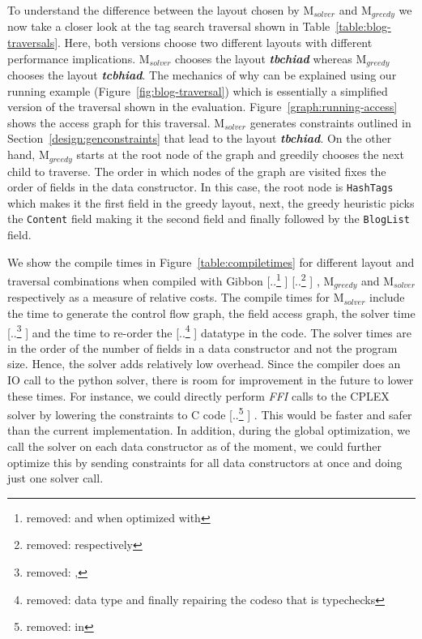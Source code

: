\documentclass[acmsmall,review,anonymous]{acmart}\settopmatter{printfolios=true,printccs=false,printacmref=false}
\newcommand{\figref}[1]{Figure~\ref{#1}\xspace}
\newcommand{\system}{{\sc Marmoset}\xspace}
\newcommand{\systemSolver}{{\sc M$_{\mathit{solver}}$}\xspace} %
\newcommand{\systemGreedy}{{\sc M$_{\mathit{greedy}}$}\xspace} %
\newcommand{\gibbon}{{\sc Gibbon}\xspace}
\providecommand{\DIFaddtex}[1]{{\protect\color{blue} \sf #1}} %
\providecommand{\DIFdeltex}[1]{{\protect\color{red} [..\footnote{removed: #1} ]}} %
\providecommand{\DIFaddbegin}{} %
\providecommand{\DIFaddend}{} %
\providecommand{\DIFdelbegin}{} %
\providecommand{\DIFdelend}{} %
\providecommand{\DIFadd}[1]{\texorpdfstring{\DIFaddtex{#1}}{#1}} %
\providecommand{\DIFdel}[1]{\texorpdfstring{\DIFdeltex{#1}}{}} %
\newcommand{\DIFscaledelfig}{0.5}
\newlength{\DIFdelgraphicswidth} %
\newlength{\DIFdelgraphicsheight} %
\newcommand{\DIFaddincludegraphics}[2][]{{\color{blue}\fbox{\DIFOincludegraphics[#1]{#2}}}} %
\newcommand{\DIFdelincludegraphics}[2][]{%
\sbox{\DIFdelgraphicsbox}{\DIFOincludegraphics[#1]{#2}}%
\settoboxwidth{\DIFdelgraphicswidth}{\DIFdelgraphicsbox} %
\settoboxtotalheight{\DIFdelgraphicsheight}{\DIFdelgraphicsbox} %
\scalebox{\DIFscaledelfig}{%
\parbox[b]{\DIFdelgraphicswidth}{\usebox{\DIFdelgraphicsbox}\\[-\baselineskip] \rule{\DIFdelgraphicswidth}{0em}}\llap{\resizebox{\DIFdelgraphicswidth}{\DIFdelgraphicsheight}{%
\setlength{\unitlength}{\DIFdelgraphicswidth}%
\begin{picture}(1,1)%
\thicklines\linethickness{2pt} %
{\color[rgb]{1,0,0}\put(0,0){\framebox(1,1){}}}%
{\color[rgb]{1,0,0}\put(0,0){\line( 1,1){1}}}%
{\color[rgb]{1,0,0}\put(0,1){\line(1,-1){1}}}%
\end{picture}%
}\hspace*{3pt}}} %
} %
\DeclareRobustCommand{\DIFaddbegin}{\DIFOaddbegin \let\includegraphics\DIFaddincludegraphics} %
\DeclareRobustCommand{\DIFaddend}{\DIFOaddend \let\includegraphics\DIFOincludegraphics} %
\DeclareRobustCommand{\DIFdelbegin}{\DIFOdelbegin \let\includegraphics\DIFdelincludegraphics} %
\DeclareRobustCommand{\DIFdelend}{\DIFOaddend \let\includegraphics\DIFOincludegraphics} %
\begin{document}
\DIFaddbegin \DIFadd{To understand the difference between the layout chosen by }\systemSolver \DIFadd{and }\systemGreedy \DIFadd{we now take a closer look at the tag search traversal shown in Table~\ref{table:blog-traversals}.
Here, both versions choose two different layouts with different performance implications. }\systemSolver \DIFadd{chooses the layout \textbf{\textit{tbchiad}} whereas }\systemGreedy \DIFadd{chooses 
the layout \textbf{\textit{tcbhiad}}. The mechanics of why can be explained using our running example (Figure~\ref{fig:blog-traversal}) which is essentially a simplified version of the 
traversal shown in the evaluation. Figure~\ref{graph:running-access} shows the access graph for this traversal. }\systemSolver \DIFadd{generates constraints 
outlined in Section~\ref{design:genconstraints} that lead to the layout \textbf{\textit{tbchiad}}. On the other hand, }\systemGreedy \DIFadd{starts at the root node of the graph and greedily chooses the next child to traverse. 
The order in which nodes of the graph are visited fixes the order of fields in the data constructor. In this case, the root node is }{\color{blue}%
\lstinline|HashTags| %
}%
\DIFadd{which makes it the first field in the greedy 
layout, next, the greedy heuristic picks the }{\color{blue}%
\lstinline|Content| %
}%
\DIFadd{field making it the second field and finally followed by the }{\color{blue}%
\lstinline|BlogList| %
}%
\DIFadd{field.
}

\DIFaddend We show the compile times in \figref{table:compiletimes} for different layout and traversal combinations when compiled with \gibbon\DIFdelbegin \DIFdel{and when optimized with }%
\DIFdel{respectively }\DIFdelend \DIFaddbegin \DIFadd{, }\systemGreedy \DIFadd{and }\systemSolver \DIFadd{respectively as 
a measure of relative costs}\DIFaddend . The compile times for \DIFdelbegin %
\DIFdelend \DIFaddbegin \systemSolver \DIFaddend include the time to generate the control flow graph, the field access graph, the solver time \DIFdelbegin \DIFdel{, }\DIFdelend \DIFaddbegin \DIFadd{and }\DIFaddend the time to re-order the \DIFdelbegin \DIFdel{data type and finally repairing the codeso that is typechecks}\DIFdelend \DIFaddbegin \DIFadd{datatype in the code}\DIFaddend .
The solver times are in the order of the number of fields in a data constructor and not the program size. Hence, the solver adds relatively low overhead.
Since the compiler does an IO call to the python solver, there is room for improvement in the future to lower these times. 
For instance, we could directly perform \textit{FFI} calls to the CPLEX solver by lowering the constraints to C code\DIFdelbegin \DIFdel{in }%
\DIFdelend . 
This would be faster and safer than the current implementation. In addition, during the global optimization, we call the solver on each data constructor as of the moment, 
we could further optimize this by sending constraints for all data constructors at once and doing just one solver call. 
\end{document}

